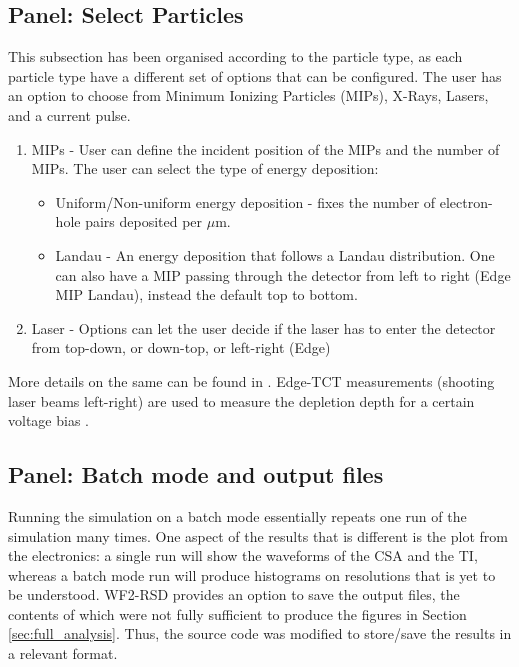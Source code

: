 \documentclass[11pt]{article}
\begin{document}
\subsection{Panel: Select Particles}
This subsection has been organised according to the particle type, as each particle type have a different set of options that can be configured. The user has an option to choose from Minimum Ionizing Particles (MIPs), X-Rays, Lasers, and a current pulse.
\begin{enumerate}
    \item MIPs - User can define the incident position of the MIPs and the number of MIPs. The user can select the type of energy deposition:
    \begin{itemize}
        \item Uniform/Non-uniform energy deposition - fixes the number of electron-hole pairs deposited per $\mu$m.
        \item Landau - An energy deposition that follows a Landau distribution. One can also have a MIP passing through the detector from left to right (Edge MIP Landau), instead the default top to bottom.
    \end{itemize}
    \item Laser - Options can let the user decide if the laser has to enter the detector from top-down, or down-top, or left-right (Edge)
\end{enumerate}
More details on the same can be found in \cite{WF2-incident-particles-cenna}.
\newline
Edge-TCT measurements (shooting laser beams left-right) are used to measure the depletion depth for a certain voltage bias \cite{moll-acceptor-removal}.

\subsection{Panel: Batch mode and output files}
Running the simulation on a batch mode essentially repeats one run of the simulation many times. One aspect of the results that is different is the plot from the electronics: a single run will show the waveforms of the CSA and the TI, whereas a batch mode run will produce histograms on resolutions that is yet to be understood.
\newline
WF2-RSD provides an option to save the output files, the contents of which were not fully sufficient to produce the figures in Section \ref{sec:full_analysis}. Thus, the source code was modified to store/save the results in a relevant format.
\end{document}
